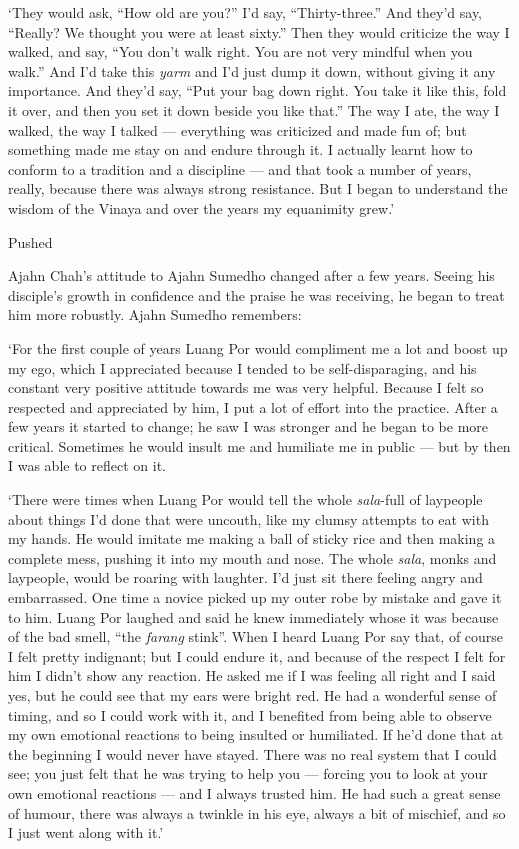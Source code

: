 `They would ask, ``How old are you?'' I'd say, ``Thirty-three.'' And
they'd say, ``Really? We thought you were at least sixty.'' Then they
would criticize the way I walked, and say, ``You don't walk right. You
are not very mindful when you walk.'' And I'd take this \emph{yarm} and
I'd just dump it down, without giving it any importance. And they'd say,
``Put your bag down right. You take it like this, fold it over, and then
you set it down beside you like that.'' The way I ate, the way I walked,
the way I talked --- everything was criticized and made fun of; but
something made me stay on and endure through it. I actually learnt how
to conform to a tradition and a discipline --- and that took a number of
years, really, because there was always strong resistance. But I began
to understand the wisdom of the Vinaya and over the years my equanimity
grew.'

Pushed

Ajahn Chah's attitude to Ajahn Sumedho changed after a few years. Seeing
his disciple's growth in confidence and the praise he was receiving, he
began to treat him more robustly. Ajahn Sumedho remembers:

`For the first couple of years Luang Por would compliment me a lot and
boost up my ego, which I appreciated because I tended to be
self-disparaging, and his constant very positive attitude towards me was
very helpful. Because I felt so respected and appreciated by him, I put
a lot of effort into the practice. After a few years it started to
change; he saw I was stronger and he began to be more critical.
Sometimes he would insult me and humiliate me in public --- but by then
I was able to reflect on it.

`There were times when Luang Por would tell the whole \emph{sala}-full
of laypeople about things I'd done that were uncouth, like my clumsy
attempts to eat with my hands. He would imitate me making a ball of
sticky rice and then making a complete mess, pushing it into my mouth
and nose. The whole \emph{sala}, monks and laypeople, would be roaring
with laughter. I'd just sit there feeling angry and embarrassed. One
time a novice picked up my outer robe by mistake and gave it to him.
Luang Por laughed and said he knew immediately whose it was because of
the bad smell, ``the \emph{farang} stink''. When I heard Luang Por say
that, of course I felt pretty indignant; but I could endure it, and
because of the respect I felt for him I didn't show any reaction. He
asked me if I was feeling all right and I said yes, but he could see
that my ears were bright red. He had a wonderful sense of timing, and so
I could work with it, and I benefited from being able to observe my own
emotional reactions to being insulted or humiliated. If he'd done that
at the beginning I would never have stayed. There was no real system
that I could see; you just felt that he was trying to help you ---
forcing you to look at your own emotional reactions --- and I always
trusted him. He had such a great sense of humour, there was always a
twinkle in his eye, always a bit of mischief, and so I just went along
with it.'

